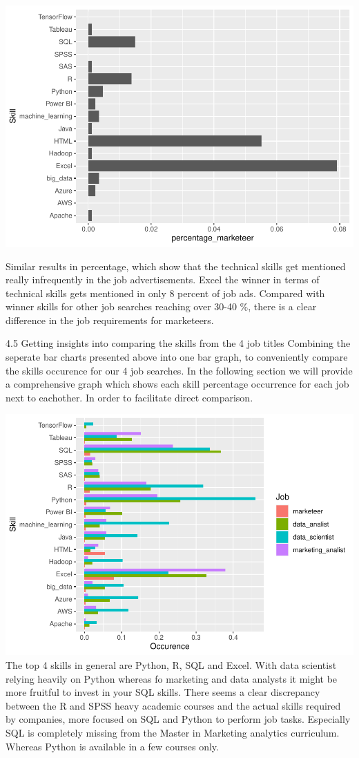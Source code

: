 \documentclass[
]{article}
\begin{document}
\includegraphics{analysis_files/figure-latex/unnamed-chunk-23-1.pdf}

Similar results in percentage, which show that the technical skills get
mentioned really infrequently in the job advertisements. Excel the
winner in terms of technical skills gets mentioned in only 8 percent of
job ads. Compared with winner skills for other job searches reaching
over 30-40 \%, there is a clear difference in the job requirements for
marketeers.

4.5 Getting insights into comparing the skills from the 4 job titles
Combining the seperate bar charts presented above into one bar graph, to
conveniently compare the skills occurence for our 4 job searches. In the
following section we will provide a comprehensive graph which shows each
skill percentage occurrence for each job next to eachother. In order to
facilitate direct comparison.

\includegraphics{analysis_files/figure-latex/unnamed-chunk-25-1.pdf} The
top 4 skills in general are Python, R, SQL and Excel. With data
scientist relying heavily on Python whereas fo marketing and data
analysts it might be more fruitful to invest in your SQL skills. There
seems a clear discrepancy between the R and SPSS heavy academic courses
and the actual skills required by companies, more focused on SQL and
Python to perform job tasks. Especially SQL is completely missing from
the Master in Marketing analytics curriculum. Whereas Python is
available in a few courses only.
\end{document}
